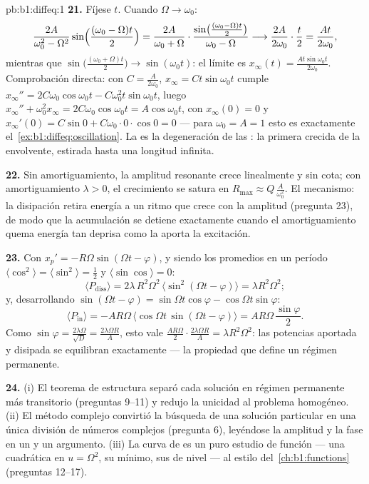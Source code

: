 \begin{solution}{pb:b1:diffeq:1}
\textbf{21.} Fíjese $t$. Cuando $\Omega \to \omega_0$:
\[
\frac{2A}{\omega_0^2 - \Omega^2}\sin\Bigl(\frac{(\omega_0 -
\Omega)t}2\Bigr)
= \frac{2A}{\omega_0 + \Omega}\cdot
\frac{\sin\bigl(\frac{(\omega_0 - \Omega)t}2\bigr)}
{\omega_0 - \Omega}
\longrightarrow \frac{2A}{2\omega_0}\cdot\frac t2
= \frac{At}{2\omega_0} ,
\]
mientras que $\sin\bigl(\frac{(\omega_0 + \Omega)t}2\bigr) \to
\sin(\omega_0 t)$: el límite es $x_\infty(t) =
\frac{At\sin\omega_0 t}{2\omega_0}$. Comprobación directa: con
$C = \frac A{2\omega_0}$, $x_\infty = Ct\sin\omega_0 t$ cumple
$x_\infty'' = 2C\omega_0\cos\omega_0 t - C\omega_0^2 t
\sin\omega_0 t$, luego $x_\infty'' + \omega_0^2 x_\infty =
2C\omega_0\cos\omega_0 t = A\cos\omega_0 t$, con $x_\infty(0) = 0$ y
$x_\infty'(0) = C\sin 0 + C\omega_0 \cdot 0 \cdot \cos 0 = 0$ --- para
$\omega_0 = A = 1$ esto es exactamente
el~\cref{ex:b1:diffeq:oscillation}. La  es la degeneración
de las : la primera crecida de la envolvente, estirada hasta
una longitud infinita.

\textbf{22.} Sin amortiguamiento, la amplitud resonante crece
linealmente y sin cota; con amortiguamiento $\lambda > 0$, el
crecimiento se satura en $R_{\max} \approx Q\,\frac A{\omega_0^2}$. El
mecanismo: la disipación retira energía a un ritmo que crece con la
amplitud (pregunta 23), de modo que la acumulación se detiene
exactamente cuando el amortiguamiento quema energía tan deprisa como la
aporta la excitación.

\textbf{23.} Con $x_p' = -R\Omega\sin(\Omega t - \varphi)$, y siendo
los promedios en un período $\langle\cos^2\rangle =
\langle\sin^2\rangle = \frac12$ y $\langle\sin\cos\rangle = 0$:
\[
\langle P_{\mathrm{diss}}\rangle
= 2\lambda\,R^2\Omega^2\,\langle\sin^2(\Omega t -
\varphi)\rangle = \lambda R^2\Omega^2 ;
\]
y, desarrollando $\sin(\Omega t - \varphi) = \sin\Omega t\cos\varphi
- \cos\Omega t\sin\varphi$:
\[
\langle P_{\mathrm{in}}\rangle
= -AR\Omega\,\bigl\langle\cos\Omega t\,\sin(\Omega t -
\varphi)\bigr\rangle
= AR\Omega\,\frac{\sin\varphi}2 .
\]
Como $\sin\varphi = \frac{2\lambda\Omega}{\sqrt D} =
\frac{2\lambda\Omega R}A$, esto vale $\frac{AR\Omega}2 \cdot
\frac{2\lambda\Omega R}A = \lambda R^2\Omega^2$: las potencias
aportada y disipada se equilibran exactamente --- la propiedad que
define un régimen permanente.

\textbf{24.} (i) El teorema de estructura separó cada solución en
régimen permanente más transitorio (preguntas 9--11) y redujo la
unicidad al problema homogéneo. (ii) El método complejo convirtió la
búsqueda de una solución particular en una única división de números
complejos (pregunta 6), leyéndose la amplitud y la fase en un
 y un argumento. (iii) La curva de  es un puro
estudio de función --- una cuadrática en $u = \Omega^2$, su mínimo, sus
 de nivel --- al estilo del~\cref{ch:b1:functions}
(preguntas 12--17).


\end{solution}
